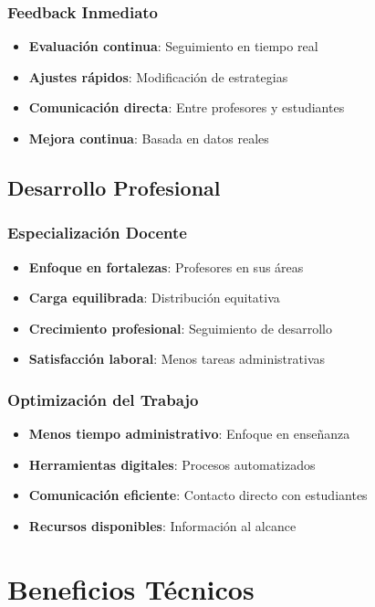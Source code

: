 \documentclass[12pt,a4paper]{article}
\begin{document}
\subsubsection{Feedback Inmediato}
\begin{itemize}
    \item \textbf{Evaluación continua}: Seguimiento en tiempo real
    \item \textbf{Ajustes rápidos}: Modificación de estrategias
    \item \textbf{Comunicación directa}: Entre profesores y estudiantes
    \item \textbf{Mejora continua}: Basada en datos reales
\end{itemize}

\subsection{Desarrollo Profesional}

\subsubsection{Especialización Docente}
\begin{itemize}
    \item \textbf{Enfoque en fortalezas}: Profesores en sus áreas
    \item \textbf{Carga equilibrada}: Distribución equitativa
    \item \textbf{Crecimiento profesional}: Seguimiento de desarrollo
    \item \textbf{Satisfacción laboral}: Menos tareas administrativas
\end{itemize}

\subsubsection{Optimización del Trabajo}
\begin{itemize}
    \item \textbf{Menos tiempo administrativo}: Enfoque en enseñanza
    \item \textbf{Herramientas digitales}: Procesos automatizados
    \item \textbf{Comunicación eficiente}: Contacto directo con estudiantes
    \item \textbf{Recursos disponibles}: Información al alcance
\end{itemize}

\section{Beneficios Técnicos}
\end{document}
